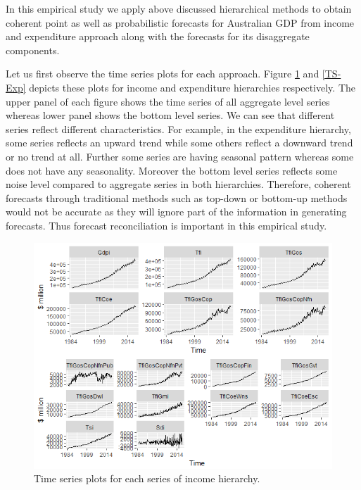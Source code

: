 \documentclass[graybox]{svmult}
\begin{document}
In this empirical study we apply above discussed hierarchical methods to obtain coherent point as well as probabilistic forecasts for Australian GDP from income and expenditure approach along with the forecasts for its disaggregate components.

Let us first observe the time series plots for each approach. Figure \ref{TS-Inc} and \ref{TS-Exp} depicts these plots for income and expenditure hierarchies respectively. The upper panel of each figure shows the time series of all aggregate level series whereas lower panel shows the bottom level series. We can see that different series reflect different characteristics. For example, in the expenditure hierarchy, some series reflects an upward trend while some others reflect a downward trend or no trend at all. Further some series are having seasonal pattern whereas some does not have any seasonality. Moreover the bottom level series reflects some noise level compared to aggregate series in both hierarchies. Therefore, coherent forecasts through traditional methods such as top-down or bottom-up methods would not be accurate as they will ignore part of the information in generating forecasts. Thus forecast reconciliation is important in this empirical study.

\begin{figure}[H]
	\centering
	\small
	\includegraphics[scale=0.65]{Figs/TS-Inc.PNG}
	\caption{Time series plots for each series of income hierarchy.}\label{TS-Inc}
\end{figure}
\end{document}
